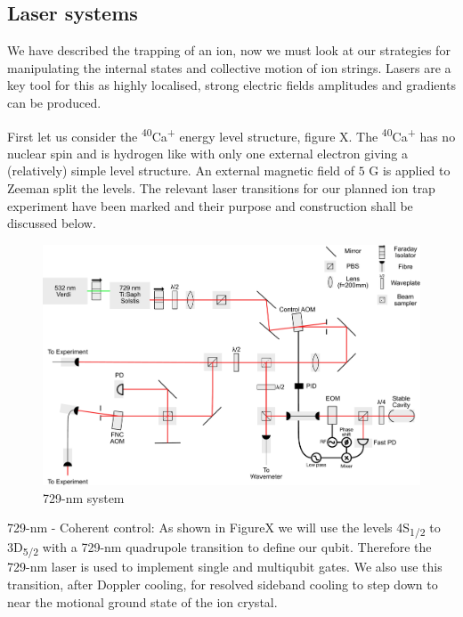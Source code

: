 \documentclass[12pt]{iopart}
\begin{document}
\subsection{Laser systems}

We have described the trapping of an ion, now we must look at our
strategies for manipulating the internal states and collective motion
of ion strings. Lasers are a key tool for this as highly localised,
strong electric fields amplitudes and gradients can be produced.

First let us consider the \textsuperscript{40}Ca\textsuperscript{+} energy
level structure, figure X. The \textsuperscript{40}Ca\textsuperscript{+} has
no nuclear spin and is hydrogen like with only one external electron
giving a (relatively) simple level structure. An external magnetic
field of $5$ G is applied to Zeeman split the levels. The relevant
laser transitions for our planned ion trap experiment have been marked
and their purpose and construction shall be discussed below.\\

\begin{figure}
  \begin{center}
   \noindent\includegraphics[width=\linewidth]{figures/729_path_small.pdf}
  \end{center}
  \caption{729-nm system}
  \label{fig:729}
\end{figure}

729-nm - Coherent control: As shown in FigureX we will use the levels
4S\textsubscript{1/2} to 3D\textsubscript{5/2} with a 729-nm
quadrupole transition to define our qubit. Therefore the 729-nm laser
is used to implement single and multiqubit gates. We also use this
transition, after Doppler cooling, for resolved sideband cooling to
step down to near the motional ground state of the ion crystal.
\end{document}
